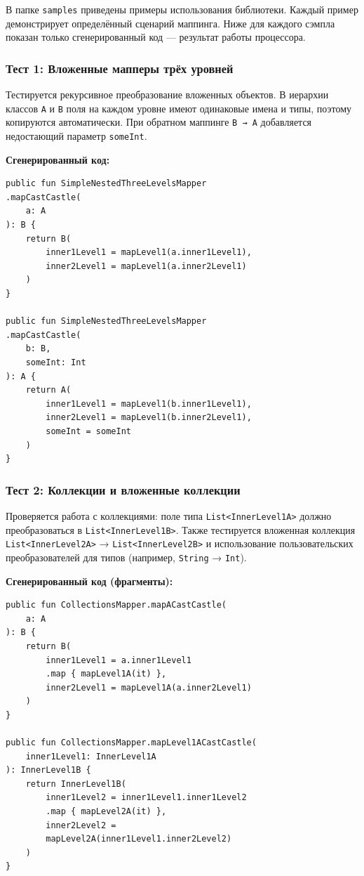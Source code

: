 В папке \texttt{samples} приведены примеры использования библиотеки. Каждый пример демонстрирует определённый сценарий маппинга. Ниже для каждого сэмпла показан только сгенерированный код — результат работы процессора.

\subsubsection{Тест 1: Вложенные мапперы трёх уровней}

Тестируется рекурсивное преобразование вложенных объектов. В иерархии классов \texttt{A} и \texttt{B} поля на каждом уровне имеют одинаковые имена и типы, поэтому копируются автоматически. При обратном маппинге \texttt{B → A} добавляется недостающий параметр \texttt{someInt}.

\textbf{Сгенерированный код:}

\begin{lstlisting}
public fun SimpleNestedThreeLevelsMapper
.mapCastCastle(
    a: A
): B {
    return B(
        inner1Level1 = mapLevel1(a.inner1Level1),
        inner2Level1 = mapLevel1(a.inner2Level1)
    )
}

public fun SimpleNestedThreeLevelsMapper
.mapCastCastle(
    b: B,
    someInt: Int
): A {
    return A(
        inner1Level1 = mapLevel1(b.inner1Level1),
        inner2Level1 = mapLevel1(b.inner2Level1),
        someInt = someInt
    )
}
\end{lstlisting}

\subsubsection{Тест 2: Коллекции и вложенные коллекции}

Проверяется работа с коллекциями: поле типа \texttt{List<InnerLevel1A>} должно преобразоваться в \texttt{List<InnerLevel1B>}. Также тестируется вложенная коллекция \texttt{List<InnerLevel2A>} → \texttt{List<InnerLevel2B>} и использование пользовательских преобразователей для типов (например, \texttt{String} → \texttt{Int}).

\textbf{Сгенерированный код (фрагменты):}

\begin{lstlisting}
public fun CollectionsMapper.mapACastCastle(
    a: A
): B {
    return B(
        inner1Level1 = a.inner1Level1
        .map { mapLevel1A(it) },
        inner2Level1 = mapLevel1A(a.inner2Level1)
    )
}

public fun CollectionsMapper.mapLevel1ACastCastle(
    inner1Level1: InnerLevel1A
): InnerLevel1B {
    return InnerLevel1B(
        inner1Level2 = inner1Level1.inner1Level2
        .map { mapLevel2A(it) },
        inner2Level2 = 
        mapLevel2A(inner1Level1.inner2Level2)
    )
}
\end{lstlisting}


